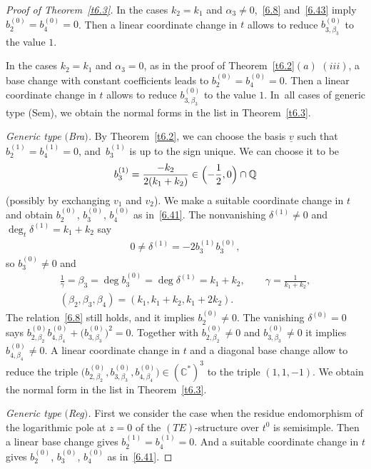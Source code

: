 \documentclass[pdftex]{sigma}%
\numberwithin{equation}{section}
\numberwithin{figure}{section}
\newcommand{\Q}{{\mathbb Q}}
\newcommand{\C}{{\mathbb C}}
\newcommand{\uuuu}{\underline}
\begin{document}
\begin{proof}[Proof of Theorem~\ref{t6.3}]
In the cases $k_2=k_1$ and $\alpha_3\neq 0$,~\eqref{6.8}
and~\eqref{6.43} imply $b_2^{(0)}=b_4^{(0)}=0$.
Then a linear coordinate change in $t$ allows to reduce
$b_{3,\beta_3}^{(0)}$ to the value $1$.

In the cases $k_2=k_1$ and $\alpha_3=0$,
as in the proof of Theorem~\ref{t6.2}$(a)$ $(iii)$,
a base change with constant coefficients leads to
$b_2^{(0)}=b_4^{(0)}=0$. Then a linear coordinate change
in $t$ allows to reduce $b_{3,\beta_3}^{(0)}$ to the value
$1$. In~all cases of generic type (Sem), we obtain the
normal forms in the list in Theorem~\ref{t6.3}.

\medskip\noindent
{\it Generic type $($Bra$)$.}
By Theorem~\ref{t6.2}, we can choose the basis $\uuuu{v}$
such that $b_2^{(1)}=b_4^{(1)}=0$,
and~$b_3^{(1)}$ is up to the sign unique.
We can choose it to be
\begin{gather*}
b_3^{(1)}=\frac{-k_2}{2(k_1+k_2)}\in
\Bigl(-\frac{1}{2},0\Bigr)\cap\Q
\end{gather*}
(possibly by exchanging $v_1$ and $v_2$).
We make a suitable coordinate change in $t$ and obtain
$b_2^{(0)}$, $b_3^{(0)}$, $b_4^{(0)}$ as in~\eqref{6.41}.
The nonvanishing $\delta^{(1)}\neq 0$
and $\deg_t\delta^{(1)}=k_1+k_2$ say
\begin{gather*}
0\neq \delta^{(1)}=-2b_3^{(1)}b_3^{(0)},
\end{gather*}
so $b_3^{(0)}\neq 0$ and
\begin{gather*}%
\frac1\gamma=\beta_3=\deg b_3^{(0)}=\deg\delta^{(1)}=k_1+k_2,\qquad
\gamma=\frac{1}{k_1+k_2},
\\
(\beta_2,\beta_3,\beta_4)=(k_1,k_1+k_2,k_1+2k_2).%
\end{gather*}
The relation~\eqref{6.8} still holds, and it implies
$b_2^{(0)}\neq 0$. The vanishing $\delta^{(0)}=0$ says
$b_{2,\beta_2}^{(0)}b_{4,\beta_4}^{(0)}+\big(b_{3,\beta_3}^{(0)}\big)^2
= 0$. Together with $b_{2,\beta_2}^{(0)}\neq 0$ and
$b_{3,\beta_3}^{(0)}\neq 0$ it implies
$b_{4,\beta_4}^{(0)}\neq 0$.
A linear coordinate change in $t$
and a diagonal base change allow to reduce the triple
$\big(b_{2,\beta_2}^{(0)},b_{3,\beta_3}^{(0)},b_{4,\beta_4}^{(0)}\big)
\in(\C^*)^3$ to the triple $(1,1,-1)$. We obtain the
normal form in the list in Theorem~\ref{t6.3}.

\medskip\noindent
{\it Generic type $($Reg$)$.}
First we consider the case when the residue endomorphism
of the logarithmic pole at $z=0$ of the $(TE)$-structure
over $t^0$ is semisimple. Then a linear base change
gives $b_2^{(1)}=b_4^{(1)}=0$. And a suitable coordinate
change in $t$ gives $b_2^{(0)}$, $b_3^{(0)}$, $b_4^{(0)}$
as in~\eqref{6.41}.


\end{proof}
\end{document}
